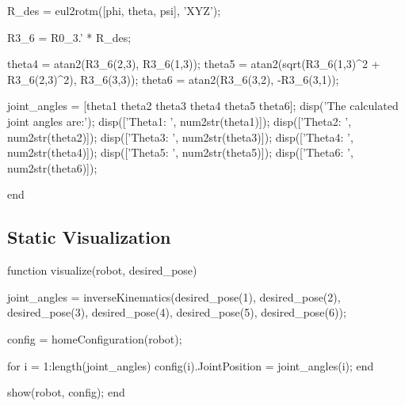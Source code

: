 \documentclass[conference]{IEEEtran}
\begin{document}
\begin{matlabcode}[label={InverseKinCodeAppendix}]
    R_des = eul2rotm([phi, theta, psi], 'XYZ'); %
    
    R3_6 = R0_3.' * R_des; %
    
    theta4 = atan2(R3_6(2,3), R3_6(1,3));
    theta5 = atan2(sqrt(R3_6(1,3)^2 + R3_6(2,3)^2), R3_6(3,3));
    theta6 = atan2(R3_6(3,2), -R3_6(3,1));
    
    joint_angles = [theta1 theta2 theta3 theta4 theta5 theta6];
    disp('The calculated joint angles are:');
    disp(['Theta1: ', num2str(theta1)]);
    disp(['Theta2: ', num2str(theta2)]);
    disp(['Theta3: ', num2str(theta3)]);
    disp(['Theta4: ', num2str(theta4)]);
    disp(['Theta5: ', num2str(theta5)]);
    disp(['Theta6: ', num2str(theta6)]);

end
\end{matlabcode}
\subsection{Static Visualization}
\begin{matlabcode}[label={StaticVisAppendix}]
function visualize(robot, desired_pose)
    
    joint_angles = inverseKinematics(desired_pose(1), desired_pose(2), desired_pose(3), desired_pose(4), desired_pose(5), desired_pose(6));
    
    config = homeConfiguration(robot);
    
    for i = 1:length(joint_angles)
        config(i).JointPosition = joint_angles(i);
    end
    
    show(robot, config);
end
\end{matlabcode}
\end{document}
